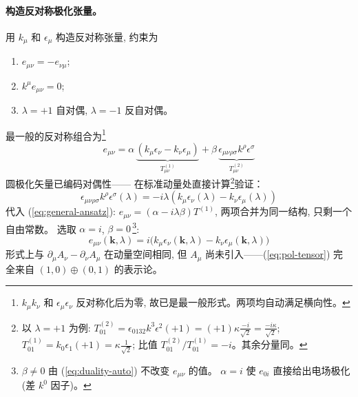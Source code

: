 \paragraph*{构造反对称极化张量。}
用 $k_\mu$ 和 $\epsilon_\mu$ 构造反对称张量, 
约束为
\begin{enumerate}
    \item $e_{\mu\nu}=-e_{\nu\mu}$;
    \item $k^\mu e_{\mu\nu}=0$;
    \item $\lambda=+1$ 自对偶, $\lambda=-1$ 反自对偶。
\end{enumerate} 
最一般的反对称组合为\footnote{%
$k_\mu k_\nu$ 和 $\epsilon_\mu\epsilon_\nu$ 反对称化后为零, 
故已是最一般形式。两项均自动满足横向性。}
\begin{equation}
    e_{\mu\nu} = \alpha\,\underbrace{(k_\mu\epsilon_\nu-k_\nu\epsilon_\mu)}_{T^{(1)}_{\mu\nu}}
    +\beta\,\underbrace{\epsilon_{\mu\nu\rho\sigma}k^\rho\epsilon^\sigma}_{T^{(2)}_{\mu\nu}}
    \label{eq:general-ansatz}
\end{equation}
圆极化矢量已编码对偶性——
在标准动量处直接计算\footnote{%
以 $\lambda=+1$ 为例:
$T^{(2)}_{01}=\epsilon_{0132}k^3\epsilon^2(+1)
=(+1)\kappa\frac{-i}{\sqrt{2}}=\frac{-i\kappa}{\sqrt{2}}$;
$T^{(1)}_{01}=k_0\epsilon_1(+1)=\kappa\frac{1}{\sqrt{2}}$;
比值 $T^{(2)}_{01}/T^{(1)}_{01}=-i$。其余分量同。}验证：
\begin{equation}
    \epsilon_{\mu\nu\rho\sigma}k^\rho\epsilon^\sigma(\lambda)
    = -i\lambda(k_\mu\epsilon_\nu(\lambda)-k_\nu\epsilon_\mu(\lambda))
    \label{eq:duality-auto}
\end{equation}
代入 (\ref{eq:general-ansatz}):
$e_{\mu\nu}=(\alpha-i\lambda\beta)T^{(1)}$, 
两项合并为同一结构, 只剩一个自由常数。
选取 $\alpha=i$, $\beta=0$\,\footnote{%
$\beta\neq 0$ 由 (\ref{eq:duality-auto}) 不改变 $e_{\mu\nu}$ 的值。
$\alpha=i$ 使 $e_{0i}$ 直接给出电场极化 (差 $k^0$ 因子)。}:
\begin{equation}
    \boxed{e_{\mu\nu}(\mathbf{k},\lambda)
    = i\bigl(k_\mu\epsilon_\nu(\mathbf{k},\lambda)
    -k_\nu\epsilon_\mu(\mathbf{k},\lambda)\bigr)}
    \label{eq:pol-tensor}
\end{equation}
形式上与 $\partial_\mu A_\nu-\partial_\nu A_\mu$ 在动量空间相同,
但 $A_\mu$ 尚未引入——(\ref{eq:pol-tensor}) 完全来自
$(1,0)\oplus(0,1)$ 的表示论。


